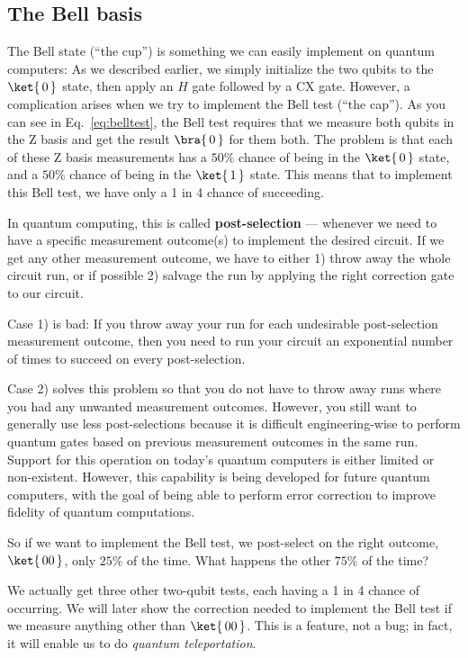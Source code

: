 \documentclass{article}
\theoremstyle{definition}
\newcommand{\kz}[1]{\ket{\,#1\,}}
\newcommand{\bz}[1]{\bra{\,#1\,}}
\begin{document}
\subsection{The Bell basis}
The Bell state (``the cup'') is something we can easily implement on quantum computers: As we described earlier, we simply initialize the two qubits to the $\kz0$ state, then apply an $H$ gate followed by a CX gate.
However, a complication arises when we try to implement the Bell test (``the cap'').
As you can see in Eq.~\eqref{eq:belltest}, the Bell test requires that we measure both qubits in the Z basis and get the result $\bz0$ for them both.
The problem is that each of these Z basis measurements has a $50\%$ chance of being in the $\kz0$ state, and a $50\%$ chance of being in the $\kz1$ state.
This means that to implement this Bell test, we have only a 1 in 4 chance of succeeding.

In quantum computing, this is called \textbf{post-selection} --- whenever we need to have a specific measurement outcome(s) to implement the desired circuit.  If we get any other measurement outcome, we have to either 1) throw away the whole circuit run, or if possible 2) salvage the run by applying the right correction gate to our circuit.

Case 1) is bad:  If you throw away your run for each undesirable post-selection measurement outcome, then you need to run your circuit an exponential number of times to succeed on every post-selection.

Case 2) solves this problem so that you do not have to throw away runs where you had any unwanted measurement outcomes.  However, you still want to generally use less post-selections because it is difficult engineering-wise to perform quantum gates based on previous measurement outcomes in the same run.  Support for this operation on today's quantum computers is either limited or non-existent.  However, this capability is being developed for future quantum computers, with the goal of being able to perform error correction to improve fidelity of quantum computations.

So if we want to implement the Bell test, we post-select on the right outcome, $\kz{00}$, only $25\%$ of the time.
What happens the other $75\%$ of the time?

We actually get three other two-qubit tests, each having a 1 in 4 chance of occurring.
We will later show the correction needed to implement the Bell test if we measure anything other than $\kz{00}$.
This is a feature, not a bug; in fact, it will enable us to do \emph{quantum teleportation}.
\end{document}

